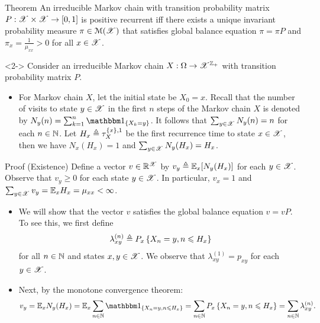 \documentclass[12pt,aspectratio=169]{beamer}
\begin{document}
\begin{frame}
\begin{block}{Theorem} 
An irreducible Markov chain with transition probability matrix $P:\mathscr{X}\times\mathscr{X}\to[0,1]$ is positive recurrent iff there exists a unique invariant probability measure $\pi \in \mathcal{M}(\mathscr{X})$ that satisfies global balance equation $\pi = \pi P$ and $\pi_x = \frac{1}{\mu_{xx}} > 0$ for all $x \in \mathscr{X}$. 
\end{block}

\begin{Proof}<2->
Consider an irreducible Markov chain $X:\Omega\to\mathscr{X}^{\mathbb{Z}_+}$ with transition probability matrix $P$.  
\begin{itemize}
\item[Implication:]<3->
For Markov chain $X$, let the initial state be $X_0 = x$. 
Recall that the number of visits to state $y \in \mathscr{X}$ in the first $n$ steps of the Markov chain $X$ is denoted by $N_y(n) = \sum_{k=1}^n\SetIn{X_k = y}$.  
It follows that $\sum_{y \in \mathscr{X}}N_y(n) = n$ for each $n \in \mathbb{N}$. 
Let $H_x \triangleq \tau_X^{\left\{x\right\},1}$ be the first recurrence time to state $x\in\mathscr{X}$, then we have $N_x(H_x) = 1$ and $\sum_{y \in \mathscr{X}}N_y(H_x) = H_x$.
\end{itemize}
\end{Proof}
\end{frame}

\begin{frame}
\begin{block}{Proof (Existence)}
Define a vector $v \in \mathbb{R}^{\mathscr{X}}$ by $v_y \triangleq \mathbb{E}_x[N_y(H_x)]$ for each $y \in \mathscr{X}$. Observe that $v_y \ge 0$ for each state $y \in \mathscr{X}$.  
In particular, $v_x = 1$ and $\sum_{y \in \mathscr{X}} v_y = \mathbb{E}_x H_x = \mu_{xx} < \infty$.

\begin{itemize}
\item<2-> We will show that the vector $v$ satisfies the global balance equation $v = vP$. To see this, we first define
\[
\lambda_{xy}^{(n)}  \triangleq P_x\left\{X_n = y, n \leqslant H_x\right\}
\]
for all $n \in \mathbb{N}$ and states $x,y \in \mathscr{X}$.  
We observe that $\lambda_{xy}^{(1)} = p_{xy}$ for each $y \in \mathscr{X}$.

\item<3-> Next, by the monotone convergence theorem:
\begin{equation*}
\label{eqn:Eigenvector}
v_y = \E_x N_y(H_x) = \E_x\sum_{n \in \N} \SetIn{X_n = y, n \le H_x}
= \sum_{n \in \N} P_x\set{X_n = y, n \le H_x} = \sum_{n \in \N} \lambda_{xy}^{(n)}.
\end{equation*}
\end{itemize}
\end{block}
\end{frame}
\end{document}
